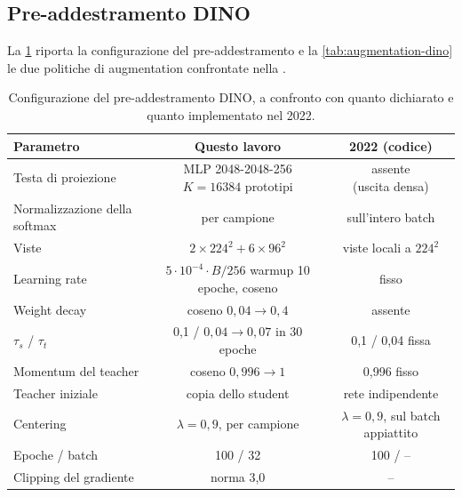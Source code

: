 \subsection{Pre-addestramento DINO}

La \cref{tab:iperparametri-dino} riporta la configurazione del pre-addestramento e la
\cref{tab:augmentation-dino} le due politiche di augmentation confrontate nella .

\begin{table}[t]
  \centering
  \small
  \caption[Configurazione del pre-addestramento DINO]{Configurazione del pre-addestramento DINO,
    a confronto con quanto dichiarato e quanto implementato nel 2022.}
  \label{tab:iperparametri-dino}
  \begin{tabular}{|l|c|c|}
    \hline
    \textbf{Parametro} & \textbf{Questo lavoro} & \textbf{2022 (codice)} \\
    \hline
    Testa di proiezione & \makecell{MLP 2048-2048-256\\$K=\num{16384}$ prototipi} & \makecell{assente\\(uscita densa)} \\
    Normalizzazione della softmax & per campione & sull'intero batch \\
    Viste & $2\times224^2+6\times96^2$ & viste locali a $224^2$ \\
    Learning rate & \makecell{$5\cdot10^{-4}\cdot B/256$\\warmup 10 epoche, coseno} & fisso \\
    Weight decay & coseno $0{,}04\to0{,}4$ & assente \\
    $\tau_s$ / $\tau_t$ & \makecell{0,1 / $0{,}04\to0{,}07$\\in 30 epoche} & 0,1 / 0,04 fissa \\
    Momentum del teacher & coseno $0{,}996\to1$ & 0,996 fisso \\
    Teacher iniziale & copia dello student & rete indipendente \\
    Centering & $\lambda=0{,}9$, per campione & \makecell{$\lambda=0{,}9$, sul batch\\appiattito} \\
    Epoche / batch & 100 / 32 & 100 / -- \\
    Clipping del gradiente & norma 3,0 & -- \\
    \hline
  \end{tabular}
\end{table}

